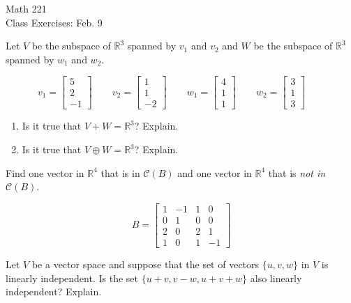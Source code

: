\documentclass[11pt]{article}
\begin{document}
\begin{center}
\Large
\rm{Math 221}
\\
\rm{Class Exercises:  Feb. 9}
\\
\end{center}
\vspace{0.2in}




Let $V$ be the subspace of $\mathbb{R}^3$ spanned by $v_1$ and $v_2$  and $W$ be the subspace of $\mathbb{R}^3$ spanned by $w_1$ and $w_2$.  

\begin{displaymath}
v_1 = \left[ \begin{array}{r} 5 \\ 2 \\ -1 \end{array}\right]
\quad\quad
v_2 = \left[ \begin{array}{r} 1 \\ 1 \\ -2 \end{array}\right]
\quad\quad
w_1 = \left[ \begin{array}{r} 4 \\ 1 \\ 1 \end{array}\right]
\quad\quad
w_2 = \left[ \begin{array}{r} 3 \\ 1 \\ 3 \end{array}\right]
\quad\quad
\end{displaymath}

\begin{enumerate}
	\item {Is it true that $V+W=\mathbb{R}^3$?  Explain.}
	\item {Is it true that $V\oplus W=\mathbb{R}^3$?  Explain.}	
\end{enumerate}
\pagebreak
Find one vector in $\mathbb{R}^4$ that is in $\mathcal{C}(B)$ and one vector in $\mathbb{R}^4$ that is \textit{not in} $\mathcal{C}(B)$.

\begin{displaymath}
B = \left[ \begin{array}{rrrr} 
1 & -1 & 1 & 0 \\ 
0 & 1 & 0 & 0  \\
2 & 0 & 2 & 1  \\
1 & 0 & 1 & -1 
\end{array}\right]
\end{displaymath}

\vspace{4in}

Let $V$ be a vector space and suppose that the set of vectors $\{u,v,w \}$ in $V$ is linearly independent. Is the set $\{u+v,v-w,u+v+w  \}$ also linearly independent?  Explain.
\end{document}
